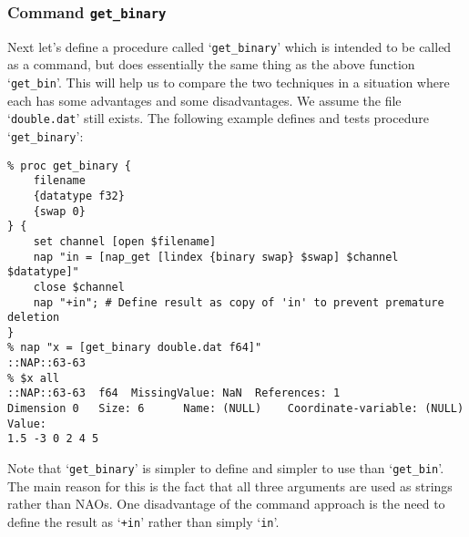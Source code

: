 \subsubsection{Command \texttt{get\_binary}}
    \label{writing-procs-get-binary}

Next let's define a procedure called `\texttt{get\_binary}' which is intended to be called as a
  command, but does essentially the same thing as the above function
  `\texttt{get\_bin}'. This will help us to compare the two
  techniques in a situation where each has some advantages and some
  disadvantages. We assume the file `\texttt{double.dat}' still exists. The following example
  defines and tests procedure `\texttt{get\_binary}':
  \begin{verbatim}
% proc get_binary {
    filename
    {datatype f32}
    {swap 0}
} {
    set channel [open $filename]
    nap "in = [nap_get [lindex {binary swap} $swap] $channel $datatype]"
    close $channel
    nap "+in"; # Define result as copy of 'in' to prevent premature deletion
}
% nap "x = [get_binary double.dat f64]"
::NAP::63-63
% $x all
::NAP::63-63  f64  MissingValue: NaN  References: 1
Dimension 0   Size: 6      Name: (NULL)    Coordinate-variable: (NULL)
Value:
1.5 -3 0 2 4 5
\end{verbatim}

Note that `\texttt{get\_binary}' is simpler to define and simpler to use
  than `\texttt{get\_bin}'. The main reason for this is the fact that
  all three arguments are used as strings rather than NAOs. One
  disadvantage of the command approach is the need to define the result
  as `\texttt{+in}' rather than simply `\texttt{in}'.
